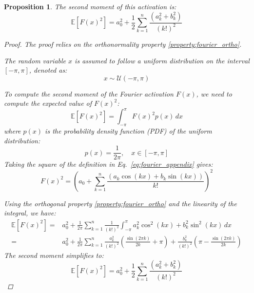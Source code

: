 \documentclass{article} %
\theoremstyle{plain}
\newtheorem{proposition}[theorem]{Proposition}
\theoremstyle{definition}
\theoremstyle{remark}
\begin{document}
\begin{proposition}
\label{prop:fourier_forward_gain}
The second moment of this activation is:
\begin{equation}
\label{eq:fourier_simple}
\mathbb{E}[F(x)^2] = a_0^2 +  \frac{1}{2}\sum_{k=1}^{n} \frac{\left( a_k^2 + b_k^2 \right)}{(k!)^2}
\end{equation}
\begin{proof}
The proof relies on the orthonormality property \ref{property:fourier_ortho}.

The random variable \( x \) is assumed to follow a uniform distribution on the interval \( [-\pi, \pi] \), denoted as:
\begin{equation}
    x \sim \mathcal{U}\left(-\pi, \pi\right)
\end{equation}


To compute the second moment of the Fourier activation \( F(x) \), we need to compute the expected value of \( F(x)^2 \):
\begin{equation}
    \mathbb{E}[F(x)^2] = \int_{-\pi}^{\pi} F(x)^2 p(x) \, dx
\end{equation}
where \( p(x) \) is the probability density function (PDF) of the uniform distribution:
\begin{equation}
    p(x) = \frac{1}{2\pi}, \quad x \in [-\pi, \pi]
\end{equation}
Taking the square of the definition in Eq.~\ref{eq:fourier_appendix} gives:
\begin{equation}
F(x)^2 = \left( a_0 + \sum_{k=1}^{n} \frac{\left(a_k \cos(k x) + b_k \sin(k x)\right)}{k!} \right)^2
\end{equation}

Using the orthogonal property \ref{property:fourier_ortho} and the linearity of the integral, we have:
\begin{align}
	\mathbb{E}[F(x)^2] = & a_0^2 + \frac{1}{2\pi} \sum_{k=1}^{n} \frac{1}{(k!)^2}\int_{-\pi}^{\pi} a_k^2 \cos^2(k x) + b_k^2\sin^2(k x) \, dx  \\ 
    = &a_0^2 + \frac{1}{2\pi} \sum_{k=1}^{n} \frac{a_k^2}{(k!)^2}\left(\frac{\sin(2\pi k)}{2k} + \pi\right)  + \frac{b_k^2}{(k!)^2}\left(\pi-\frac{\sin(2\pi k)}{2k} \right)     
\end{align}
The second moment simplifies to:
\begin{equation}
\mathbb{E}[F(x)^2] = a_0^2 +  \frac{1}{2}\sum_{k=1}^{n} \frac{\left( a_k^2 + b_k^2 \right)}{(k!)^2}
\end{equation}
\end{proof}
\end{proposition}
\end{document}
